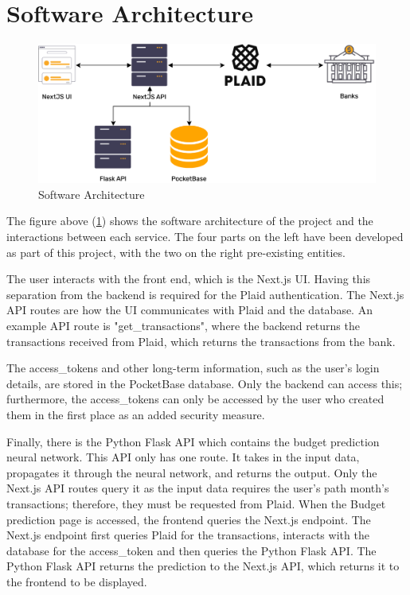 \section{Software Architecture}

\begin{figure}[H]
	\centering
	\includegraphics[width=\textwidth]{images/software_architecture.png}
	\caption{Software Architecture}
	\label{fig:SoftwareArchitecture}
\end{figure}

The figure above (\ref{fig:SoftwareArchitecture}) shows the software architecture of the project and the interactions between each service. The four parts on the left have been developed as part of this project, with the two on the right pre-existing entities. 

The user interacts with the front end, which is the Next.js UI. Having this separation from the backend is required for the Plaid authentication. The Next.js API routes are how the UI communicates with Plaid and the database. An example API route is "get\_transactions", where the backend returns the transactions received from Plaid, which returns the transactions from the bank.

The access\_tokens and other long-term information, such as the user's login details, are stored in the PocketBase database. Only the backend can access this; furthermore, the access\_tokens can only be accessed by the user who created them in the first place as an added security measure. 

Finally, there is the Python Flask API which contains the budget prediction neural network. This API only has one route. It takes in the input data, propagates it through the neural network, and returns the output. Only the Next.js API routes query it as the input data requires the user's path month's transactions; therefore, they must be requested from Plaid. When the Budget prediction page is accessed, the frontend queries the Next.js endpoint. The Next.js endpoint first queries Plaid for the transactions, interacts with the database for the access\_token and then queries the Python Flask API. The Python Flask API returns the prediction to the Next.js API, which returns it to the frontend to be displayed.

